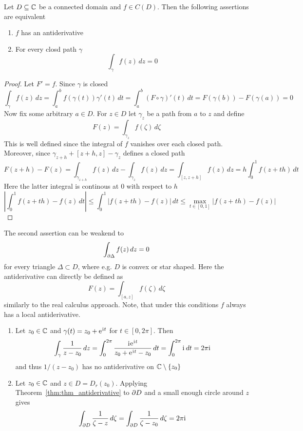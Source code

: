 \begin{definition}
\begin{theorem}\label{thm:thm_antiderivative}
Let \( D \subseteq \mathbb{C} \) be a connected domain and \( f \in C(D)\). Then the following assertions are equivalent
\begin{enumerate}
	\item \( f \) has an antiderivative
	\item For every closd path \( \gamma \)
		\[
			\int_{\gamma} f(z)\,dz = 0
		\]
\end{enumerate}
\end{theorem}

\begin{proof} Let \( F' = f \). Since \( \gamma \) is closed
	\[
		\int_\gamma f(z)\,dz
			  = \int_a^b f(\gamma(t))\gamma'(t)\,dt 
			  = \int_a^b (F\circ\gamma)'(t)\,dt 
			  = F(\gamma(b)) - F(\gamma(a)) = 0
	\]
Now fix some arbitrary \( a \in D \). For \( z \in D \) let \( \gamma_z \) be a path from \( a \) to \( z \) 
and define
\[
	F(z) = \int_{\gamma_z} f(\zeta)\,d\zeta
\]
This is well defined since the integral of \( f \) vanishes over each closed path. Moreover, since
\( \gamma_{z + h} + [z + h,z] - \gamma_z \) defines a closed path
\[
	F(z + h) - F(z)
		= \int_{\gamma_{z + h}} f(z)\,dz - \int_{\gamma_z} f(z)\,dz
		= \int_{[z,z + h]} f(z)\,dz
		= h\int_0^1 f(z + th)\,dt
\]
Here the latter integral is continous at \( 0 \) with respect to \( h \)
\[
	\left|\int_0^1 f(z + th) - f(z)\,dt\right| 
		\le \int_0^1 |f(z + th) - f(z)|\,dt 
		\le \max_{t \in [0,1]}|f(z + th) - f(z)|
\]
\end{proof}
\bigskip


\begin{corollary}The second assertion can be weakend to 
\[
	\int_{\partial\Delta} f(z)\,dz = 0
\]
for every triangle \( \Delta \subset D\), where e.g. \( D \) is convex or star shaped. Here the antiderivative
can directly be defined as 
\[
	F(z) = \int_{[a,z]} f(\zeta)\,d\zeta
\]
similarly to the real calculus approach. Note, that under this conditions \( f \) always has a local antiderivative.
\end{corollary}
\bigskip


\begin{examples}\hfill
    \begin{enumerate}
        \item Let \( z_0 \in \mathbb{C} \) and \( \gamma(t) = z_0 + \mathrm{e}\mkern1mu^{\mathrm{i}\mkern1mu t} \) for \( t \in [0, 2\pi] \). Then
			\[
				\int_\gamma \frac{1}{z - z_0}\,dz 
					= \int_0^{2\pi} \frac{\mathrm{i}\mkern1mu \mathrm{e}\mkern1mu^{\mathrm{i}\mkern1mu t}}{z_0 + \mathrm{e}\mkern1mu^{\mathrm{i}\mkern1mu t} - z_0}\,dt
					= \int_0^{2\pi} \mathrm{i}\mkern1mu\,dt
					= 2\pi\mathrm{i}\mkern1mu
			\]
			and thus \( 1/ (z - z_0 ) \) has no antiderivative on \( \mathbb{C} \setminus \{z_0\} \)
        \item Let \( z_0 \in \mathbb{C} \) and \( z \in D = D_r(z_0) \). Applying Theorem~\ref{thm:thm_antiderivative} 
			to \( \partial D \) and a small enough circle around \( z \) gives
			\[
				\int_{\partial D} \frac{1}{\zeta - z}\,d\zeta
					= \int_{\partial D} \frac{1}{\zeta - z_0}\,d\zeta
					= 2\pi\mathrm{i}\mkern1mu
			\]
    \end{enumerate}
\end{examples}
\bigskip



\end{definition}
